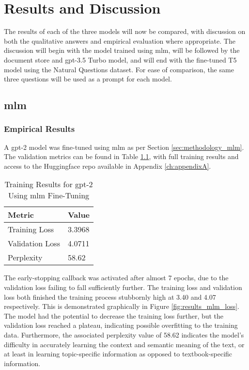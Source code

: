 \chapter{Results and Discussion}\label{ch:results}
The results of each of the three models will now be compared, with discussion on both the qualitative answers and empirical evaluation where appropriate. The discussion will begin with the model trained using \acrfull{mlm}, will be followed by the document store and \acrshort{gpt}-3.5 Turbo model, and will end with the fine-tuned T5 model using the Natural Questions dataset. For ease of comparison, the same three questions will be used as a prompt for each model.


\section{\acrlong{mlm}}\label{sec:results_mlm}
\subsection{Empirical Results}
A \acrshort{gpt}-2 model was fine-tuned using \acrlong{mlm} as per Section \ref{sec:methodology_mlm}. The validation metrics can be found in Table \ref{tab:results_mlm}, with full training results and access to the Huggingface repo available in Appendix \ref{ch:appendixA}.

\begin{table}[ht!]
    \centering
    \begin{tabular}{l|l}
        \textbf{Metric} & \textbf{Value} \\ \hline
        Training Loss & 3.3968 \\ \hline
        Validation Loss & 4.0711 \\ \hline
        Perplexity & 58.62 \\
    \end{tabular}
    \caption{Training Results for \acrshort{gpt}-2 Using \acrshort{mlm} Fine-Tuning}
    \label{tab:results_mlm}
\end{table}

The early-stopping callback was activated after almost 7 epochs, due to the validation loss failing to fall sufficiently further. The training loss and validation loss both finished the training process stubbornly high at 3.40 and 4.07 respectively. This is demonstrated graphically in Figure \ref{fig:results_mlm_loss}. The model had the potential to decrease the training loss further, but the validation loss reached a plateau, indicating possible overfitting to the training data. Furthermore, the associated perplexity value of 58.62 indicates the model's difficulty in accurately learning the context and semantic meaning of the text, or at least in learning topic-specific information as opposed to textbook-specific information.

